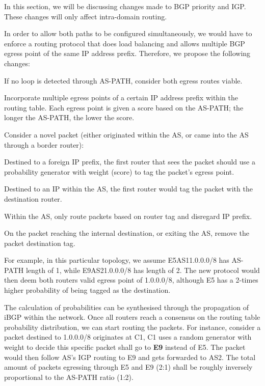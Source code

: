 \documentclass[12pt]{article}
\newcommand{\SubItem}[1]{
    {\setlength\itemindent{15pt} \item[-] #1}
}
\begin{document}
In this section, we will be discussing changes made to BGP priority and IGP. These changes will only affect intra-domain routing.

In order to allow both paths to be configured simultaneously, we would have to enforce a routing protocol that does load balancing and allows multiple BGP egress point of the same IP address prefix. Therefore, we propose the following changes:

\begin{itemize}
    \item If no loop is detected through AS-PATH, consider both egress routes viable.
    \item Incorporate multiple egress points of a certain IP address prefix within the routing table. Each egress point is given a score based on the AS-PATH; the longer the AS-PATH, the lower the score.
    \item Consider a novel packet (either originated within the AS, or came into the AS through a border router):
    \SubItem{Destined to a foreign IP prefix, the first router that sees the packet should use a probability generator with weight (score) to tag the packet's egress point.}
    \SubItem{Destined to an IP within the AS, the first router would tag the packet with the destination router.}
    \item Within the AS, only route packets based on router tag and disregard IP prefix.
    \item On the packet reaching the internal destination, or exiting the AS, remove the packet destination tag.
\end{itemize}

For example, in this particular topology, we assume E5\textrightarrow{}AS1\textrightarrow{}1.0.0.0/8 has AS-PATH length of 1, while E9\textrightarrow{}AS2\textrightarrow{}1.0.0.0/8 has length of 2. The new protocol would then deem both routers valid egress point of 1.0.0.0/8, although E5 has a 2-times higher probability of being tagged as the destination.

The calculation of probabilities can be synthesised through the propagation of iBGP within the network. Once all routers reach a consensus on the routing table probability distribution, we can start routing the packets. For instance, consider a packet destined to 1.0.0.0/8 originates at C1, C1 uses a random generator with weight to decide this specific packet shall go to \textbf{E9} instead of \textcolor{mygray}{E5}. The packet would then follow AS's IGP routing to E9 and gets forwarded to AS2. The total amount of packets egressing through E5 and E9 (2:1) shall be roughly inversely proportional to the AS-PATH ratio (1:2).
\end{document}
